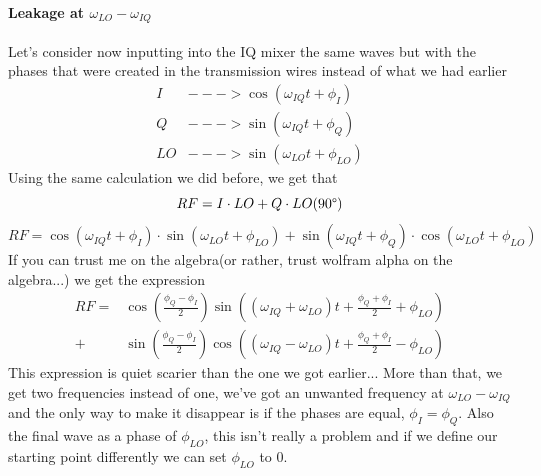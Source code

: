 \documentclass[english, a4paper, 12pt, twoside]{article}
\numberwithin{equation}{section} %
\begin{document}
\paragraph*{Leakage at \(\omega_{LO} - \omega_{IQ}\) }
Let's consider now inputting into the IQ mixer the same waves but with the phases that were created in the transmission wires instead of what we had earlier
\begin{align*}
    I &---> \cos(\omega_{IQ} t + \phi_I) \\%
    Q &---> \sin(\omega_{IQ} t + \phi_Q) \\%
    LO &---> \sin(\omega_{LO}t + \phi_{LO})
\end{align*}
Using the same calculation we did before, we get that
$$RF = I\cdot LO + Q\cdot LO(90\degree)$$
\[
RF = \cos(\omega_{IQ} t + \phi_I) \cdot \sin(\omega_{LO}t + \phi_{LO}) + \sin(\omega_{IQ} t + \phi_Q) \cdot \cos(\omega_{LO}t + \phi_{LO}) 
\]
If you can trust me on the algebra(or rather, trust wolfram alpha on the algebra...) we get the expression
\begin{align*}
RF = &\cos(\frac{\phi_Q - \phi_I}{2})\sin((\omega_{IQ} + \omega_{LO})t + \frac{\phi_Q + \phi_I}{2} + \phi_{LO}) \\
   + &\sin(\frac{\phi_Q - \phi_I}{2})\cos((\omega_{IQ} - \omega_{LO})t + \frac{\phi_Q + \phi_I}{2} - \phi_{LO})
\end{align*}
This expression is quiet scarier than the one we got earlier... More than that, we get two frequencies instead of one, we've got an unwanted frequency at \(\omega_{LO} - \omega_{IQ}\) and the only way to make it disappear is if the phases are equal, \(\phi_I = \phi_Q\). Also the final wave as a phase of \(\phi_{LO}\), this isn't really a problem and if we define our starting point differently we can set  \(\phi_{LO}\) to 0.
\end{document}
